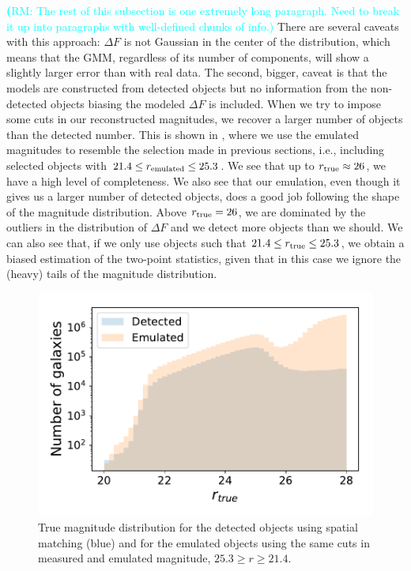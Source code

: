 \documentclass[twocolumn]{aastex62}
\newcommand{\rachel}[1]{{\textcolor{cyan}{{\textbf (RM: #1)}}}}
\begin{document}
\rachel{The rest of this subsection is one extremely long paragraph.  Need to break it up into paragraphs with well-defined chunks of info.}
There are several caveats with this approach: $\Delta F$ is not Gaussian in the center of the distribution, which means that the GMM, regardless of its number of components, will show a slightly larger error than with real data. The second, bigger, caveat is that the models are constructed from detected objects but no information from the non-detected objects biasing the modeled $\Delta F$ is included. When we try to impose some cuts in our reconstructed magnitudes, we recover a larger number of objects than the detected number. This is shown in , where we use the emulated magnitudes to resemble the selection made in previous sections, i.e., including selected objects with $21.4 \leq r_{\rm emulated} \leq 25.3$. We see that up to $r _{\rm true} \approx 26$, we have a high level of completeness. We also see that our emulation, even though it gives us a larger number of detected objects, does a good job following the shape of the magnitude distribution. Above $r_{\rm true}=26$, we are dominated by the outliers in the distribution of $\Delta F$ and we detect more objects than we should. We can also see that, if we only use objects such that $21.4 \leq r_{\rm true} \leq 25.3$, we obtain a biased estimation of the two-point statistics, given that in this case we ignore the (heavy) tails of the magnitude distribution.
\begin{figure}
\centering
\includegraphics[width=0.9\columnwidth]{emulated_magnitude_histogram}
\caption{True magnitude distribution for the detected objects using spatial matching (blue) and for the emulated objects using the same cuts in measured and emulated magnitude, $25.3 \geq r \geq 21.4$.}
\label{fig:emulated_magnitudes}
\end{figure}
\end{document}
